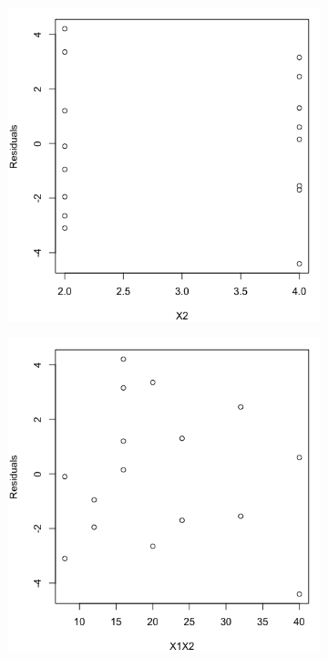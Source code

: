 \documentclass[10pt]{report}
\begin{document}
\begin{enumerate}
\begin{figure}[H]
\begin{subfigure}[b]{.4\linewidth}
		\end{subfigure}\\
		\begin{subfigure}[b]{.4\linewidth}
			\includegraphics[width=\linewidth]{p1/5d3.png} 
		\end{subfigure}
		\begin{subfigure}[b]{.4\linewidth}
			\includegraphics[width=\linewidth]{p1/5d4.png} 

\end{subfigure}
\end{figure}
\end{enumerate}
\end{document}
